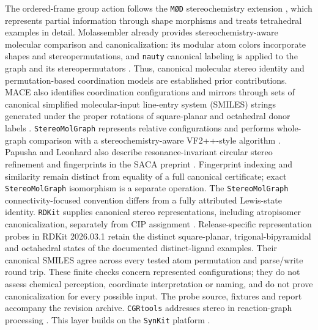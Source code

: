 \documentclass[pdflatex,sn-mathphys-num,referee,lineno]{sn-jnl}
\newcommand{\synkit}{\texttt{SynKit}\xspace}
\newcommand{\rdkit}{\texttt{RDKit}\xspace}
\newcommand{\modfw}{\texttt{M\O D}\xspace}
\newcommand{\stereomolgraph}{\texttt{StereoMolGraph}\xspace}
\newcommand{\code}[1]{\texttt{#1}}
\theoremstyle{plain}
\theoremstyle{remark}
\theoremstyle{definition}
\begin{document}
The ordered-frame group action follows the \modfw stereochemistry extension
\cite{andersen2017stereo}, which represents partial information through shape
morphisms and treats tetrahedral examples in detail.  Molassembler already
provides stereochemistry-aware molecular comparison and canonicalization:
its modular atom colors incorporate shapes and stereopermutations, and
\code{nauty} canonical labeling is applied to the graph and its
stereopermutators \cite{sobez2020molassembler}.  Thus, canonical molecular
stereo identity and permutation-based coordination models are established
prior contributions. MACE also identifies coordination configurations and
mirrors through sets of canonical simplified molecular-input line-entry system
(SMILES) strings generated under the proper rotations
of square-planar and octahedral donor labels \cite{chernyshov2024mace}.
\stereomolgraph represents relative configurations
and performs whole-graph comparison with a stereochemistry-aware
VF2++-style algorithm \cite{papusha2026stereomolgraph,stereomolgraphsource}.
Papusha and Leonhard also describe resonance-invariant circular stereo
refinement and fingerprints in the SACA preprint \cite{papusha2026saca}.
Fingerprint indexing and similarity remain distinct from equality of a full
canonical certificate; exact \stereomolgraph isomorphism is a separate operation.
The \stereomolgraph connectivity-focused convention differs from a fully
attributed Lewis-state identity.  \rdkit supplies canonical stereo
representations, including atropisomer canonicalization, separately from
CIP assignment \cite{rdkit,rdkitstereobook}. Release-specific representation
probes in RDKit 2026.03.1 retain the distinct square-planar, trigonal-bipyramidal
and octahedral states of the documented distinct-ligand examples. Their
canonical SMILES agree across every tested atom permutation and parse/write
round trip. These finite checks concern represented configurations; they do
not assess chemical perception, coordinate interpretation or naming, and do
not prove canonicalization for every possible input. The probe source,
fixtures and report accompany the revision archive.
\code{CGRtools} addresses stereo in reaction-graph processing
\cite{nugmanov2019cgrtools}. This layer builds on the \synkit platform
\cite{phan2025synkit}.
\end{document}
